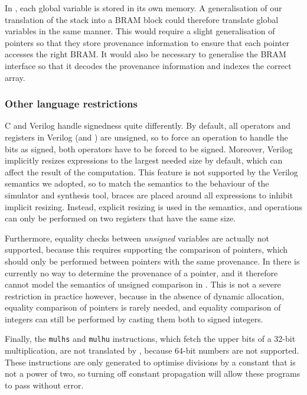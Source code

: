 In \compcert{}, each global variable is stored in its own memory.  A
generalisation of our translation of the stack into a \gls{BRAM} block could
therefore translate global variables in the same manner.  This would require a
slight generalisation of pointers so that they store provenance information to
ensure that each pointer accesses the right \gls{BRAM}. It would also be
necessary to generalise the \gls{BRAM} interface so that it decodes the
provenance information and indexes the correct array.

\subsubsection{Other language restrictions}

C and Verilog handle signedness quite differently. By default, all operators and
registers in Verilog (and \htl{}) are unsigned, so to force an operation to
handle the bits as signed, both operators have to be forced to be
signed. Moreover, Verilog implicitly resizes expressions to the largest needed
size by default, which can affect the result of the computation.  This feature
is not supported by the Verilog semantics we adopted, so to match the semantics
to the behaviour of the simulator and synthesis tool, braces are placed around
all expressions to inhibit implicit resizing.  Instead, explicit resizing is
used in the semantics, and operations can only be performed on two registers
that have the same size.

Furthermore, equality checks between \emph{unsigned} variables are actually not
supported, because this requires supporting the comparison of pointers, which
should only be performed between pointers with the same provenance.  In
\vericert{} there is currently no way to determine the provenance of a pointer,
and it therefore cannot model the semantics of unsigned comparison in
\compcert{}. This is not a severe restriction in practice however, because in
the absence of dynamic allocation, equality comparison of pointers is rarely
needed, and equality comparison of integers can still be performed by casting
them both to signed integers.

Finally, the \texttt{mulhs} and \texttt{mulhu} instructions, which fetch the
upper bits of a 32-bit multiplication, are not translated by \vericert{},
because 64-bit numbers are not supported. These instructions are only generated
to optimise divisions by a constant that is not a power of two, so turning off
constant propagation will allow these programs to pass without error.

